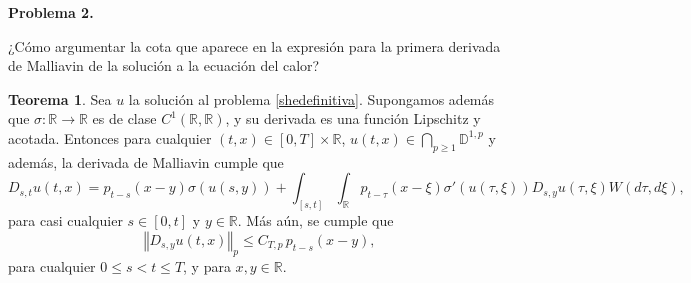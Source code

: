 \documentclass[letterpaper]{article}
\newcommand{\R}{\mathbb{R}}
\newcommand{\D}{\mathbb{D}}
\newcommand{\1}{\mathds{1}}
\renewcommand{\to}{\rightarrow}
\newcommand{\norm}[1]{\left\Vert #1 \right\Vert}
\theoremstyle{definition}
\theoremstyle{definition}
\newtheorem{teo}{Teorema}
\theoremstyle{remark}
\theoremstyle{definition}
\theoremstyle{definition}
\theoremstyle{definition}
\theoremstyle{definition}
\theoremstyle{definition}
\begin{document}
\textbf{Problema 2.} 

¿Cómo argumentar la cota que aparece en la expresión para la primera derivada de Malliavin de la solución a la ecuación del calor?

\begin{teo}
    Sea $u$ la solución al problema \eqref{shedefinitiva}. Supongamos además que $\sigma:\R\to\R$ es de clase $C^1(\R,\R)$, y su derivada es una función Lipschitz y acotada. Entonces para cualquier $(t,x)\in [0,T]\times\R$, $u(t,x)\in\bigcap_{p\geq1}\D^{1,p}$ y además, la derivada de Malliavin cumple que 
    \[
    D_{s,t}u(t,x)=p_{t-s}(x-y)\sigma(u(s,y))+ \int_{[s,t]}\int_\R p_{t-\tau}(x-\xi)\sigma'(u(\tau,\xi))D_{s,y}u(\tau,\xi)W(d\tau,d\xi),
    \]
    para casi cualquier $s\in [0,t]$ y $y\in \R$. Más aún, se cumple que 
    \begin{equation}
       \norm{D_{s,y}u(t,x)}_{p}\leq C_{T,p \ }p_{t-s}(x-y),
    \end{equation}
    para cualquier $0\leq s<t\leq T$, y para $x,y\in \R$.
  \end{teo}

 
\end{document}
